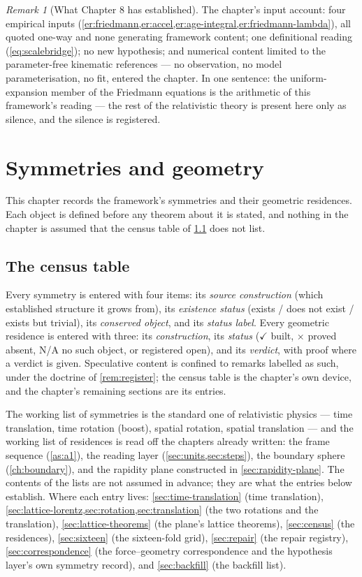 \documentclass[11pt]{amsbook}
\theoremstyle{plain}
\theoremstyle{definition}
\theoremstyle{remark}
\newtheorem{remark}[theorem]{Remark}
\begin{document}
\begin{remark}[What Chapter 8 has established]
The chapter's input account: four empirical inputs (\cref{er:friedmann,er:accel,er:age-integral,er:friedmann-lambda}), all quoted one-way and none generating framework content; one definitional reading (\cref{eq:scalebridge}); no new hypothesis; and numerical content limited to the parameter-free kinematic references --- no observation, no model parameterisation, no fit, entered the chapter. In one sentence: the uniform-expansion member of the Friedmann equations is the arithmetic of this framework's reading --- the rest of the relativistic theory is present here only as silence, and the silence is registered.
\end{remark}

\chapter{Symmetries and geometry}\label{ch:symmetries}

This chapter records the framework's symmetries and their geometric residences. Each object is defined before any theorem about it is stated, and nothing in the chapter is assumed that the census table of \cref{sec:sym-register} does not list.

\section{The census table}\label{sec:sym-register}

Every symmetry is entered with four items: its \emph{source construction} (which established structure it grows from), its \emph{existence status} (exists / does not exist / exists but trivial), its \emph{conserved object}, and its \emph{status label}. Every geometric residence is entered with three: its \emph{construction}, its \emph{status} ($\checkmark$ built, $\times$ proved absent, N/A no such object, or registered open), and its \emph{verdict}, with proof where a verdict is given. Speculative content is confined to remarks labelled as such, under the doctrine of \cref{rem:register}; the census table is the chapter's own device, and the chapter's remaining sections are its entries.

The working list of symmetries is the standard one of relativistic physics --- time translation, time rotation (boost), spatial rotation, spatial translation --- and the working list of residences is read off the chapters already written: the frame sequence (\cref{as:a1}), the reading layer (\cref{sec:units,sec:steps}), the boundary sphere (\cref{ch:boundary}), and the rapidity plane constructed in \cref{sec:rapidity-plane}. The contents of the lists are not assumed in advance; they are what the entries below establish. Where each entry lives: \cref{sec:time-translation} (time translation), \cref{sec:lattice-lorentz,sec:rotation,sec:translation} (the two rotations and the translation), \cref{sec:lattice-theorems} (the plane's lattice theorems), \cref{sec:census} (the residences), \cref{sec:sixteen} (the sixteen-fold grid), \cref{sec:repair} (the repair registry), \cref{sec:correspondence} (the force--geometry correspondence and the hypothesis layer's own symmetry record), and \cref{sec:backfill} (the backfill list).
\end{document}
